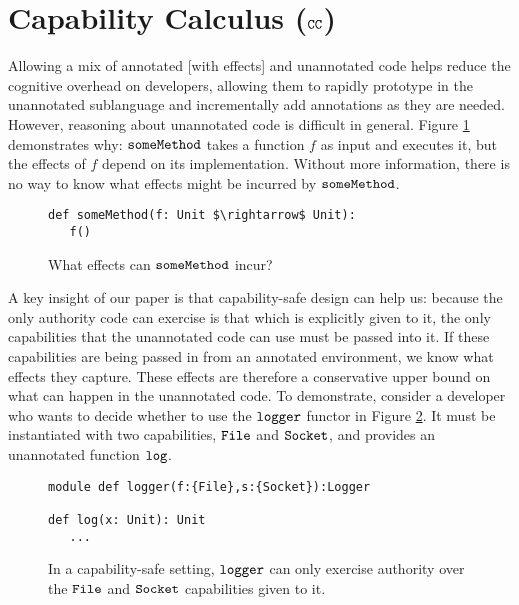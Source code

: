 \section{Capability Calculus ($\mathtt{CC}$)}
\label{s:cc}

Allowing a mix of annotated [with effects] and unannotated code helps
reduce the cognitive overhead on developers, allowing them to rapidly
prototype in the unannotated sublanguage and incrementally add
annotations as they are needed. However, reasoning about unannotated
code is difficult in general. Figure \ref{fig:unannotated_reasoning}
demonstrates why: $\mathtt{someMethod}$ takes a function $f$ as input and
executes it, but the effects of $f$ depend on its
implementation. Without more information, there is no way to know what
effects might be incurred by $\mathtt{someMethod}$.

\begin{figure}[h]
\begin{lstlisting}
def someMethod(f: Unit $\rightarrow$ Unit):
   f()
\end{lstlisting}
\vspace{-7pt}
\caption{What effects can $\mathtt{someMethod}$ incur?}
\label{fig:unannotated_reasoning}
\end{figure}

A key insight of our paper is that capability-safe design can help us:
because the only authority code can exercise is that which is
explicitly given to it, the only capabilities that the unannotated
code can use must be passed into it. If these capabilities are being
passed in from an annotated environment, we know what effects they
capture. These effects are therefore a conservative upper bound on
what can happen in the unannotated code. To demonstrate, consider a
developer who wants to decide whether to use the $\mathtt{logger}$
functor in Figure \ref{fig:cc_motivation}. It must be instantiated
with two capabilities, $\mathtt{File}$ and $\mathtt{Socket}$, and provides
an unannotated function $\mathtt{log}$.

\begin{figure}[h]
\begin{lstlisting}
module def logger(f:{File},s:{Socket}):Logger

def log(x: Unit): Unit
   ...
\end{lstlisting}
\vspace{-7pt}
\caption{In a capability-safe setting, $\mathtt{logger}$ can only exercise authority over the $\mathtt{File}$ and $\mathtt{Socket}$ capabilities given to it.}
\label{fig:cc_motivation}
\end{figure}

